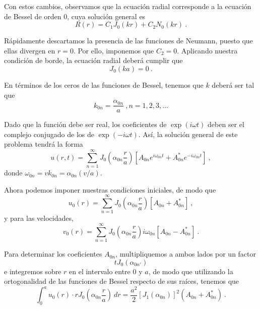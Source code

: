 \begin{ejemplo}
    Con estos cambios, observamos que la ecuación radial corresponde a la ecuación de Bessel de orden 0, cuya solución general es 
    \begin{equation*}
        R(r) = C_1 J_0(kr) + C_2 N_0(kr) \ .
    \end{equation*}

    Rápidamente descartamos la presencia de las funciones de Neumann, puesto que ellas divergen en $r = 0$. Por ello, imponemos que $C_2 = 0$. Aplicando nuestra condición de borde, la ecuación radial deberá cumplir que
    \begin{equation*}
        J_0(ka) = 0 \ .
    \end{equation*}

    En términos de los ceros de las funciones de Bessel, tenemos que $k$ deberá ser tal que
    \begin{equation*}
        k_{0n} = \frac{\alpha_{0n}}{a} \ , n = 1, 2, 3, \dots
    \end{equation*}

    Dado que la función debe ser real, los coeficientes de $\exp(i\omega t)$ deben ser el complejo conjugado de los de $\exp(-i \omega t)$. Así, la solución general de este problema tendrá la forma
    \begin{equation*}
        u(r, t) = \sum_{n=1}^\infty J_0 \left( \alpha_{0n} \frac{r}{a} \right) \left[A_{0n} e^{i \omega_{0n} t} + A^\ast_{0n} e^{-i \omega_{0n} t} \right] \ ,
    \end{equation*}
    donde $\omega_{0n} = vk_{0n} = \alpha_{0n} (v/a)$.

    Ahora podemos imponer nuestras condiciones iniciales, de modo que
    \begin{equation*}
        u_0(r) = \sum_{n=1}^\infty J_0\left( \alpha_{0n} \frac{r}{a} \right) \left[ A_{0n} + A^\ast_{0n} \right] \ ,
    \end{equation*}
    y para las velocidades,
    \begin{equation*}
        v_0(r) = \sum_{n=1}^\infty J_0\left( \alpha_{0n} \frac{r}{a} \right) i \omega_{0n} \left[ A_{0n} - A^\ast_{0n} \right] \ .
    \end{equation*}

    Para determinar los coeficientes $A_{0n}$, multipliquemos a ambos lados por un factor
    \begin{equation*}
        t J_0\left( \alpha_{0 n'} \right)
    \end{equation*}
    e integremos sobre $r$ en el intervalo entre $0$ y $a$, de modo que utilizando la ortogonalidad de las funciones de Bessel respecto de sus raíces, tenemos que
    \begin{equation*}
        \int_0^a u_0(r) \cdot r J_0\left( \alpha_{0n} \frac{r}{a} \right) \ dr = \frac{a^2}{2} [J_1(\alpha_{0n})]^2 (A_{0n} + A^\ast_{0n}) \ .
    \end{equation*}


\end{ejemplo}
